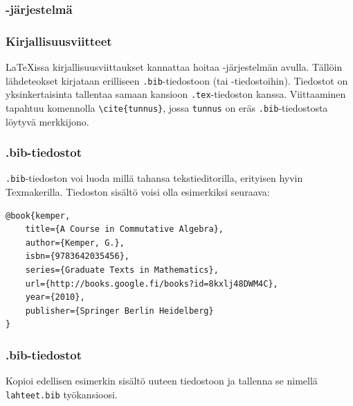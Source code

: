 \subsubsection{\BibTeX-järjestelmä}
\begin{frame}[fragile]
    \frametitle{Kirjallisuusviitteet}
    \LaTeX issa kirjallisuusviittaukset kannattaa hoitaa \BibTeX-järjestelmän avulla. 
    \vaihto
    Tällöin lähdeteokset kirjataan erilliseen \verb-.bib--tiedostoon (tai -tiedostoihin).
    \vaihto
    Tiedostot on yksinkertaisinta tallentaa samaan kansioon \verb-.tex--tiedoston kanssa.
    \vaihto
    Viittaaminen tapahtuu komennolla \verb-\cite{tunnus}-, jossa \verb-tunnus- on eräs \verb-.bib--tiedostosta löytyvä merkkijono.
\end{frame}
\begin{frame}[fragile]
    \frametitle{.bib-tiedostot}
    \verb-.bib--tiedoston voi luoda millä tahansa tekstieditorilla, erityisen hyvin Texmakerilla. 
    \vaihto
    Tiedoston sisältö voisi olla esimerkiksi seuraava:\vaihto
    \begin{scriptsize}
        \begin{Verbatim}[frame=single]
@book{kemper,
    title={A Course in Commutative Algebra},
    author={Kemper, G.},
    isbn={9783642035456},
    series={Graduate Texts in Mathematics},
    url={http://books.google.fi/books?id=8kxlj48DWM4C},
    year={2010},
    publisher={Springer Berlin Heidelberg}
}
        \end{Verbatim}
    \end{scriptsize}
\end{frame}
\begin{frame}[fragile]
    \frametitle{.bib-tiedostot}
    \begin{harj}
        Kopioi edellisen esimerkin sisältö uuteen tiedostoon ja tallenna se nimellä \verb-lahteet.bib- työkansioosi. 
    \end{harj}
\end{frame}
